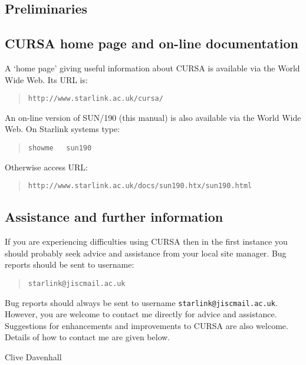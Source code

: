 \documentclass[twoside,11pt]{article}
\newcommand{\htmladdnormallink}[2]{#1}
\renewcommand{\_}{\texttt{\symbol{95}}}
\begin{document}
\begin{htmlonly}
\section*{Preliminaries}
\end{htmlonly}

\subsection*{CURSA home page and on-line documentation}
\label{HOMEPAGE}

A `home page' giving useful information about CURSA is available via
the World Wide Web. Its URL is:

\begin{quote}
\htmladdnormallink{ {\tt http://www.starlink.ac.uk/cursa/}}
{http://www.starlink.ac.uk/cursa/}
\end{quote}

An on-line version of SUN/190 (this manual) is also available via the
World Wide Web.  On Starlink systems type:

\begin{quote}
{\tt showme ~ sun190}
\end{quote}

Otherwise access URL:

\begin{quote}
\htmladdnormallink{
{\tt http://www.starlink.ac.uk/docs/sun190.htx/sun190.html}}
{http://www.starlink.ac.uk/docs/sun190.htx/sun190.html}
\end{quote}


\subsection*{Assistance and further information}

If you are experiencing difficulties using CURSA then in the first
instance you should probably seek advice and assistance from your local
site manager.  Bug reports should be sent to username:

\begin{quote}
{\tt starlink@jiscmail.ac.uk}
\end{quote}

Bug reports should always be sent to username {\tt starlink@jiscmail.ac.uk}.
However, you are welcome to contact me directly for advice and assistance.
Suggestions for enhancements and improvements to CURSA are also
welcome.  Details of how to contact me are given below.
\begin{flushright}
Clive Davenhall \\
\end{flushright}
\end{document}
